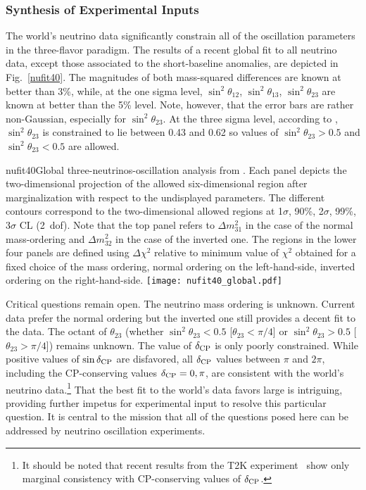 \subsubsection{Synthesis of Experimental Inputs} 

The world's neutrino data significantly constrain all of the oscillation parameters in the three-flavor paradigm. The results of a recent global fit \cite{Esteban:2018azc} to all neutrino data, except those associated to the short-baseline anomalies, are depicted in Fig.~\ref{nufit40}. The magnitudes of both mass-squared differences are known at better than 3\%, while, at the one sigma level, $\sin^2\theta_{12}$, $\sin^2\theta_{13}$, $\sin^2\theta_{23}$ are known at better than the 5\% level. Note, however, that the error bars are rather non-Gaussian, especially for $\sin^2\theta_{23}$. At the three sigma level,  according to \cite{Esteban:2018azc}, $\sin^2\theta_{23}$ is constrained to lie between 0.43 and 0.62 so values of $\sin^2\theta_{23}>0.5$ and $\sin^2\theta_{23}<0.5$ are allowed.
\begin{dunefigure}{nufit40}{Global three-neutrinos-oscillation analysis from \cite{Esteban:2018azc}. Each panel depicts the two-dimensional projection of the allowed six-dimensional region after marginalization with respect to the undisplayed parameters. The different contours correspond to the two-dimensional allowed regions at 1$\sigma$, 90\%, 2$\sigma$, 99\%, 3$\sigma$ CL (2~dof). Note that the top panel refers to $\Delta m^2_{31}$ in the case of the normal mass-ordering and $\Delta m^2_{32}$ in the case of the inverted one. The regions in the lower four panels are defined using $\Delta \chi^2$ relative to minimum value of $\chi^2$ obtained for a fixed choice of the mass ordering, normal ordering on the left-hand-side, inverted ordering on the right-hand-side.
}
  \texttt{[image: nufit40\_global.pdf]}
\end{dunefigure}

Critical questions remain open. The neutrino mass ordering is unknown. Current data prefer the normal ordering but the inverted one still provides a decent fit to the data. The octant of $\theta_{23}$ (whether $\sin^2\theta_{23}<0.5$ [$\theta_{23}<\pi/4$] or $\sin^2\theta_{23}>0.5$ [$\theta_{23}>\pi/4$]) remains unknown. The value of $\delta_{\rm CP}$ is only poorly constrained. 
While positive values of $\sin\delta_{\rm CP}$ are disfavored, all $\delta_{\rm CP}$ values between $\pi$ and $2\pi$, including the CP-conserving values $\delta_{\rm CP}=0,\pi$, are consistent with the world's neutrino data.\footnote{It should be noted that recent results from the T2K experiment~\cite{Abe:2019vii} show only marginal consistency with CP-conserving values of $\delta_{\rm CP}$.} 
That the best fit to the world's data 
favors large  is intriguing, providing further impetus 
for experimental input to resolve this particular question.
It is central to the  mission that all of the questions 
posed here can be addressed 
by neutrino oscillation experiments.

